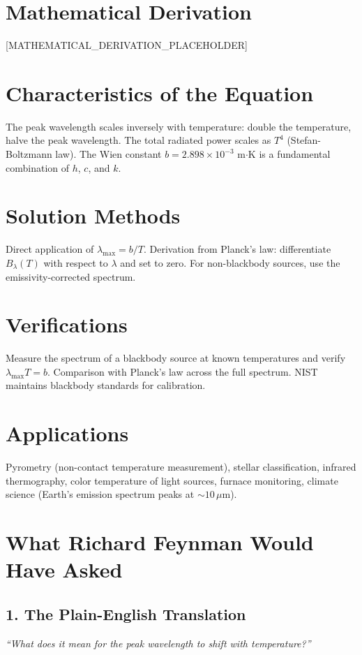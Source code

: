 \documentclass[11pt,openright]{book}
\begin{document}
\section*{Mathematical Derivation}

[MATHEMATICAL_DERIVATION_PLACEHOLDER]

\section*{Characteristics of the Equation}

The peak wavelength scales inversely with temperature: double the temperature, halve the peak wavelength. The total radiated power scales as $T^4$ (Stefan-Boltzmann law). The Wien constant $b = 2.898 \times 10^{-3}$ m$\cdot$K is a fundamental combination of $h$, $c$, and $k$.
\section*{Solution Methods}

Direct application of $\lambda_{\max} = b/T$. Derivation from Planck's law: differentiate $B_\lambda(T)$ with respect to $\lambda$ and set to zero. For non-blackbody sources, use the emissivity-corrected spectrum.
\section*{Verifications}

Measure the spectrum of a blackbody source at known temperatures and verify $\lambda_{\max} T = b$. Comparison with Planck's law across the full spectrum. NIST maintains blackbody standards for calibration.
\section*{Applications}

Pyrometry (non-contact temperature measurement), stellar classification, infrared thermography, color temperature of light sources, furnace monitoring, climate science (Earth's emission spectrum peaks at $\sim 10\,\mu$m).
\section*{What Richard Feynman Would Have Asked}

\subsection*{1. The Plain-English Translation}
\textit{``What does it mean for the peak wavelength to shift with temperature?''}
\end{document}
